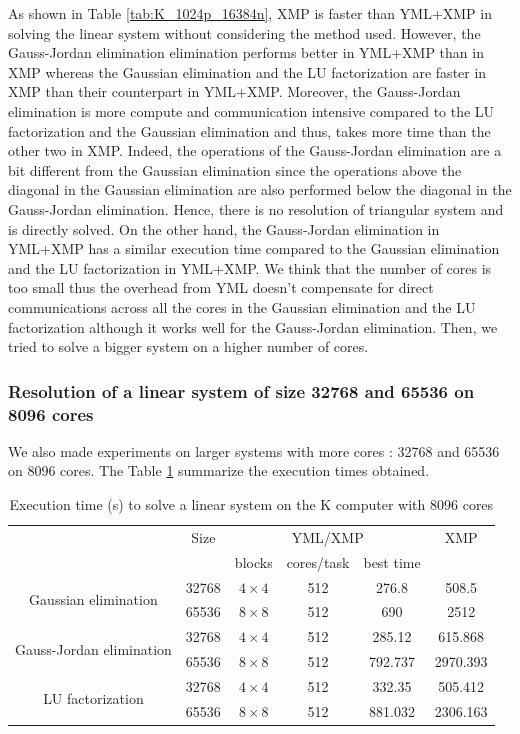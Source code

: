 As shown in Table \ref{tab:K_1024p_16384n}, XMP is faster than YML+XMP in solving the linear system without considering the method used.
However, the Gauss-Jordan elimination elimination performs better in YML+XMP than in XMP whereas the Gaussian elimination and the LU factorization are faster in XMP than their counterpart in YML+XMP.
Moreover, the Gauss-Jordan elimination is more compute and communication intensive compared to the LU factorization and the Gaussian elimination and thus, takes more time than the other two in XMP.
Indeed, the operations of the Gauss-Jordan elimination are a bit different from the Gaussian elimination since the operations above the diagonal in the Gaussian elimination are also performed below the diagonal in the Gauss-Jordan elimination.
Hence, there is no resolution of triangular system and is directly solved.
On the other hand, the Gauss-Jordan elimination in YML+XMP has a similar execution time compared to the Gaussian elimination and the LU factorization in YML+XMP.
We think that the number of cores is too small thus the overhead from YML doesn't compensate for direct communications across all the cores in the Gaussian elimination and the LU factorization although it works well for the Gauss-Jordan elimination.
Then, we tried to solve a bigger system on a higher number of cores.


\subsubsection{Resolution of a linear system of size 32768 and 65536 on 8096 cores}
We also made experiments on larger systems with more cores : 32768 and 65536 on 8096 cores.
The Table \ref{tab:K_8096p} summarize the execution times obtained.

\begin{table}[h]
	\caption{Execution time (s) to solve a linear system on the K computer with 8096 cores\label{tab:K_8096p}}
	\centering
	\begin{tabular}{cccccc}
		                                          & Size  &      \multicolumn{3}{c}{YML/XMP}      &   XMP    \\
		                                          &       &    blocks    & cores/task & best time &          \\ \hline
		  \multirow{2}{*}{Gaussian elimination}   & 32768 & $4 \times 4$ &    512     &   276.8   &  508.5   \\
		                                          & 65536 & $8 \times 8$ &    512     &    690    &   2512   \\ \hline
		\multirow{2}{*}{Gauss-Jordan elimination} & 32768 & $4 \times 4$ &    512     &  285.12   & 615.868  \\
		                                          & 65536 & $8 \times 8$ &    512     &  792.737  & 2970.393 \\ \hline
		    \multirow{2}{*}{LU factorization}     & 32768 & $4 \times 4$ &    512     &  332.35   & 505.412  \\
		                                          & 65536 & $8 \times 8$ &    512     &  881.032  & 2306.163
	\end{tabular}
\end{table}

